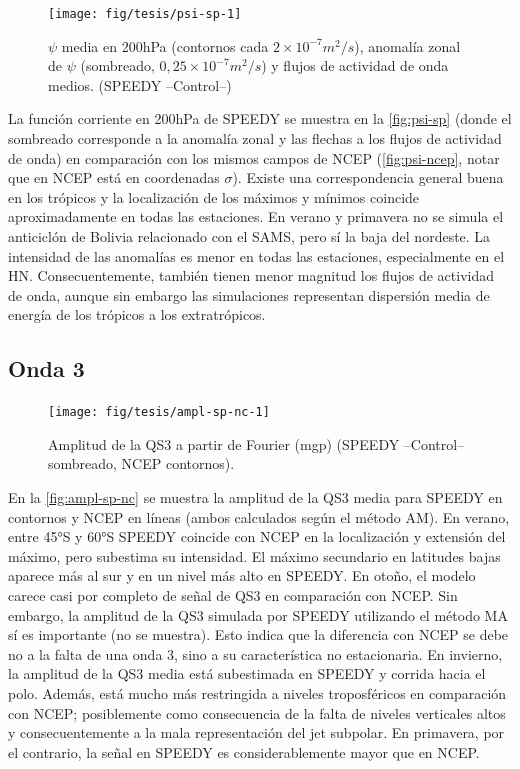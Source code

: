 \documentclass[spanish,a4paper,12pt,oneside]{book}
\begin{document}
\begin{landscape}\begin{figure}

{\centering \texttt{[image: fig/tesis/psi-sp-1]} 

}

\caption{$\psi$ media en 200hPa (contornos cada $2\times10^{-7}m^2/s$), anomalía zonal de $\psi$ (sombreado,  $0,25\times10^{-7}m^2/s$) y flujos de actividad de onda medios. (SPEEDY --Control--)}\label{fig:psi-sp}
\end{figure}
\end{landscape}

La función corriente en 200hPa de SPEEDY se muestra en la
\autoref{fig:psi-sp} (donde el sombreado corresponde a la anomalía zonal
y las flechas a los flujos de actividad de onda) en comparación con los
mismos campos de NCEP (\autoref{fig:psi-ncep}, notar que en NCEP está en
coordenadas \(\sigma\)). Existe una correspondencia general buena en los
trópicos y la localización de los máximos y mínimos coincide
aproximadamente en todas las estaciones. En verano y primavera no se
simula el anticiclón de Bolivia relacionado con el SAMS, pero sí la baja
del nordeste. La intensidad de las anomalías es menor en todas las
estaciones, especialmente en el HN. Consecuentemente, también tienen
menor magnitud los flujos de actividad de onda, aunque sin embargo las
simulaciones representan dispersión media de energía de los trópicos a
los extratrópicos.

\hypertarget{onda-3-1}{%
\subsection{Onda 3}\label{onda-3-1}}

\begin{figure}
\texttt{[image: fig/tesis/ampl-sp-nc-1]} \caption{Amplitud de la QS3 a partir de Fourier (mgp) (SPEEDY --Control-- sombreado, NCEP contornos).}\label{fig:ampl-sp-nc}
\end{figure}

En la \autoref{fig:ampl-sp-nc} se muestra la amplitud de la QS3 media
para SPEEDY en contornos y NCEP en líneas (ambos calculados según el
método AM). En verano, entre 45°S y 60°S SPEEDY coincide con NCEP en la
localización y extensión del máximo, pero subestima su intensidad. El
máximo secundario en latitudes bajas aparece más al sur y en un nivel
más alto en SPEEDY. En otoño, el modelo carece casi por completo de
señal de QS3 en comparación con NCEP. Sin embargo, la amplitud de la QS3
simulada por SPEEDY utilizando el método MA sí es importante (no se
muestra). Esto indica que la diferencia con NCEP se debe no a la falta
de una onda 3, sino a su característica no estacionaria. En invierno, la
amplitud de la QS3 media está subestimada en SPEEDY y corrida hacia el
polo. Además, está mucho más restringida a niveles troposféricos en
comparación con NCEP; posiblemente como consecuencia de la falta de
niveles verticales altos y consecuentemente a la mala representación del
jet subpolar. En primavera, por el contrario, la señal en SPEEDY es
considerablemente mayor que en NCEP.
\end{document}
